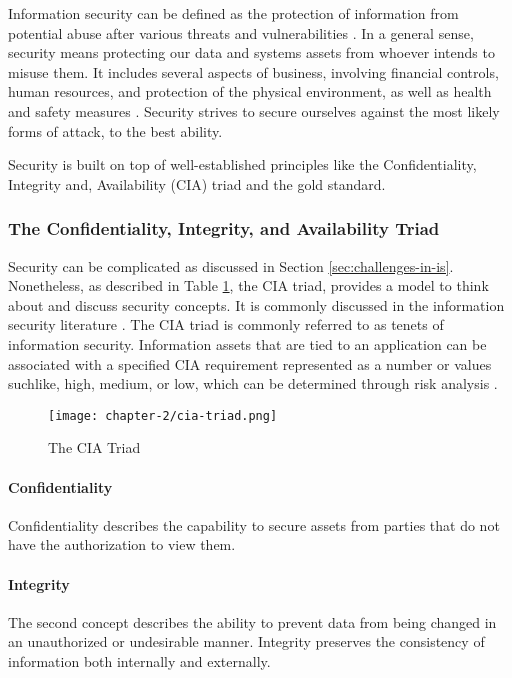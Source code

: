Information security can be defined as the protection of information from potential abuse after various threats and vulnerabilities \cite{von_Solms_2013}. In a general sense, security means protecting our data and systems assets from whoever intends to misuse them. It includes several aspects of business, involving financial controls, human resources, and protection of the physical environment, as well as health and safety measures \cite{zinatullin2016the}. Security strives to secure ourselves against the most likely forms of attack, to the best ability.

Security is built on top of well-established principles like the Confidentiality, Integrity and, Availability (CIA) triad and the gold standard.

\subsubsection{The Confidentiality, Integrity, and Availability Triad}\label{subsec:cia}
Security can be complicated as discussed in Section \ref{sec:challenges-in-is}. Nonetheless, as described in Table \ref{fig:cia}, the CIA triad, provides a model to think about and discuss security concepts. It is commonly discussed in the information security literature \cite{andress2014the} \cite{srinivasan2016cissp} \cite{death2017information}. The CIA triad is commonly referred to as tenets of information security. Information assets that are tied to an application can be associated with a specified CIA requirement represented as a number or values suchlike, high, medium, or low, which can be determined through risk analysis \cite{srinivasan2016cissp}. 

\begin{figure}[!h]
    \centering
    \texttt{[image: chapter-2/cia-triad.png]}
    \caption{The CIA Triad}\label{fig:cia}
\end{figure}

\paragraph{Confidentiality}
Confidentiality describes the capability to secure assets from parties that do not have the authorization to view them. 

\paragraph{Integrity}
The second concept describes the ability to prevent data from being changed in an unauthorized or undesirable manner. Integrity preserves the consistency of information both internally and externally.

